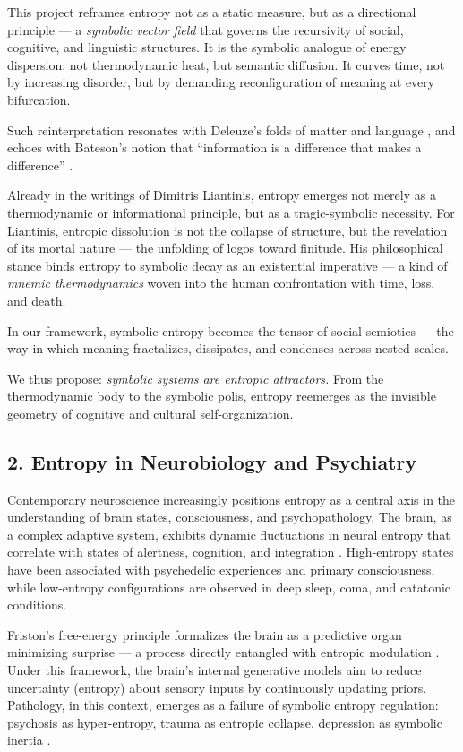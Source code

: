 This project reframes entropy not as a static measure, but as a directional principle — a \textit{symbolic vector field} that governs the recursivity of social, cognitive, and linguistic structures. It is the symbolic analogue of energy dispersion: not thermodynamic heat, but semantic diffusion. It curves time, not by increasing disorder, but by demanding reconfiguration of meaning at every bifurcation.

Such reinterpretation resonates with Deleuze's folds of matter and language \cite{deleuze1993}, and echoes with Bateson's notion that “information is a difference that makes a difference” \cite{bateson1979}.

Already in the writings of Dimitris Liantinis, entropy emerges not merely as a thermodynamic or informational principle, but as a tragic-symbolic necessity. For Liantinis, entropic dissolution is not the collapse of structure, but the revelation of its mortal nature — the unfolding of logos toward finitude. His philosophical stance binds entropy to symbolic decay as an existential imperative — a kind of \textit{mnemic thermodynamics} woven into the human confrontation with time, loss, and death.

In our framework, symbolic entropy becomes the tensor of social semiotics — the way in which meaning fractalizes, dissipates, and condenses across nested scales.

We thus propose: \textit{symbolic systems are entropic attractors.} From the thermodynamic body to the symbolic polis, entropy reemerges as the invisible geometry of cognitive and cultural self-organization.

\subsection*{2. Entropy in Neurobiology and Psychiatry}

Contemporary neuroscience increasingly positions entropy as a central axis in the understanding of brain states, consciousness, and psychopathology. The brain, as a complex adaptive system, exhibits dynamic fluctuations in neural entropy that correlate with states of alertness, cognition, and integration \cite{carhart2014, tagliazucchi2016}. High-entropy states have been associated with psychedelic experiences and primary consciousness, while low-entropy configurations are observed in deep sleep, coma, and catatonic conditions.

Friston’s free-energy principle formalizes the brain as a predictive organ minimizing surprise — a process directly entangled with entropic modulation \cite{fristonFreeenergyPrincipleUnified2010}. Under this framework, the brain's internal generative models aim to reduce uncertainty (entropy) about sensory inputs by continuously updating priors. Pathology, in this context, emerges as a failure of symbolic entropy regulation: psychosis as hyper-entropy, trauma as entropic collapse, depression as symbolic inertia \cite{fristonFreeenergyPrincipleUnified2010}.

